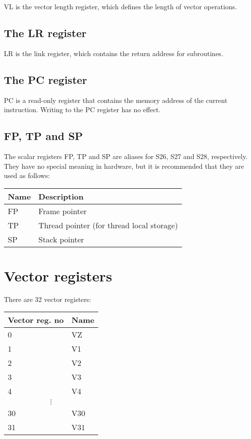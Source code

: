 VL is the vector length register, which defines the length of vector
operations.


\subsection{The LR register}

LR is the link register, which contains the return address for subroutines.

\subsection{The PC register}

PC is a read-only register that contains the memory address of the current
instruction. Writing to the PC register has no effect.

\subsection{FP, TP and SP}

The scalar registers FP, TP and SP are aliases for S26, S27 and S28,
respectively. They have no special meaning in hardware, but it is recommended
that they are used as follows:

\begin{tabular}{|l|l|}
  \hline
  \textbf{Name} & \textbf{Description} \\
  \hline
  FP & Frame pointer \\
  \hline
  TP & Thread pointer (for thread local storage) \\
  \hline
  SP & Stack pointer \\
  \hline
\end{tabular}

\section{Vector registers}

There are 32 vector registers:

\begin{tabular}{|l|l|}
  \hline
  \textbf{Vector reg. no} & \textbf{Name} \\
  \hline
  0 & VZ \\
  \hline
  1 & V1 \\
  \hline
  2 & V2 \\
  \hline
  3 & V3 \\
  \hline
  4 & V4 \\
  \hline
  \multicolumn{2}{c}{$\vdots$} \\
  \hline
  30 & V30 \\
  \hline
  31 & V31 \\
  \hline
\end{tabular}


